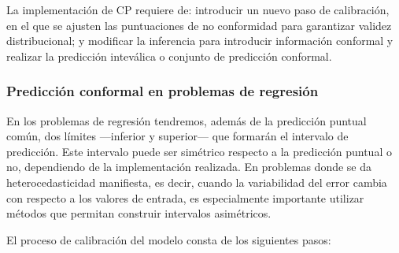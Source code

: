 
La implementación de CP requiere de: introducir un nuevo paso de calibración, en el que se ajusten
las puntuaciones de no conformidad para garantizar validez distribucional; 
y modificar la inferencia para introducir información conformal y realizar la predicción inteválica o 
conjunto de predicción conformal.


\subsubsection{Predicción conformal en problemas de regresión}

En los problemas de regresión tendremos, además de la predicción puntual común, dos límites ---inferior y 
superior--- que formarán el intervalo de predicción. 
Este intervalo puede ser simétrico respecto a la predicción puntual o no, dependiendo de la implementación
realizada.
En problemas donde se da heterocedasticidad manifiesta, es decir, cuando la variabilidad del error cambia con 
respecto a los valores de entrada, es especialmente importante utilizar métodos que permitan construir 
intervalos asimétricos.


El proceso de calibración del modelo consta de los siguientes pasos:

